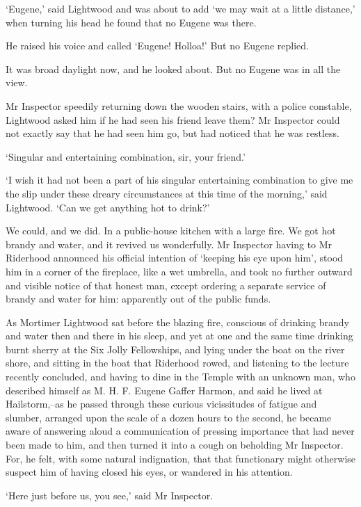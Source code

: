 ‘Eugene,’ said Lightwood and was about to add ‘we may wait at a little
distance,’ when turning his head he found that no Eugene was there.

He raised his voice and called ‘Eugene! Holloa!’ But no Eugene replied.

It was broad daylight now, and he looked about. But no Eugene was in all
the view.

Mr Inspector speedily returning down the wooden stairs, with a police
constable, Lightwood asked him if he had seen his friend leave them? Mr
Inspector could not exactly say that he had seen him go, but had noticed
that he was restless.

‘Singular and entertaining combination, sir, your friend.’

‘I wish it had not been a part of his singular entertaining combination
to give me the slip under these dreary circumstances at this time of the
morning,’ said Lightwood. ‘Can we get anything hot to drink?’

We could, and we did. In a public-house kitchen with a large fire. We
got hot brandy and water, and it revived us wonderfully. Mr Inspector
having to Mr Riderhood announced his official intention of ‘keeping
his eye upon him’, stood him in a corner of the fireplace, like a wet
umbrella, and took no further outward and visible notice of that honest
man, except ordering a separate service of brandy and water for him:
apparently out of the public funds.

As Mortimer Lightwood sat before the blazing fire, conscious of drinking
brandy and water then and there in his sleep, and yet at one and the
same time drinking burnt sherry at the Six Jolly Fellowships, and
lying under the boat on the river shore, and sitting in the boat that
Riderhood rowed, and listening to the lecture recently concluded, and
having to dine in the Temple with an unknown man, who described himself
as M. H. F. Eugene Gaffer Harmon, and said he lived at Hailstorm,--as
he passed through these curious vicissitudes of fatigue and slumber,
arranged upon the scale of a dozen hours to the second, he became aware
of answering aloud a communication of pressing importance that had
never been made to him, and then turned it into a cough on beholding
Mr Inspector. For, he felt, with some natural indignation, that that
functionary might otherwise suspect him of having closed his eyes, or
wandered in his attention.

‘Here just before us, you see,’ said Mr Inspector.

